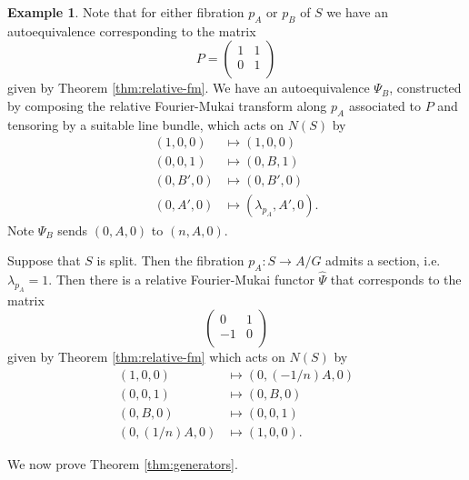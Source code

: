 \documentclass[a4paper, 12pt, twoside]{amsart}
\theoremstyle{plain}
\theoremstyle{definition}
\newtheorem{example}[theorem]{Example}
\begin{document}
\begin{example}\label{ex:relat-four-mukai-examples}
  Note that for either fibration $p_A$ or $p_B$ of $S$ we have an
  autoequivalence corresponding to the matrix
\[ P = 
  \begin{pmatrix}
    1 & 1\\
     0 & 1\\
  \end{pmatrix}
\]
given by Theorem \ref{thm:relative-fm}. We have an autoequivalence
$\Psi_B$, constructed by composing the relative Fourier-Mukai
transform along $p_A$ associated to $P$ and tensoring by a suitable
line bundle, which acts on $N(S)$ by
\begin{align*}
  (1,0,0) &\mapsto (1,0,0)\\
  (0,0,1) &\mapsto (0,B,1)\\
  (0,B',0) &\mapsto (0,B',0)\\
  (0,A',0) &\mapsto (\lambda_{p_A},A',0).
\end{align*}
Note $\Psi_B$ sends $(0,A,0)$ to $(n,A,0)$.
\newline

Suppose that $S$ is split. Then the fibration $p_A \colon S \to A/G$
admits a section, i.e. $\lambda_{p_A} = 1$. Then there is a relative
Fourier-Mukai functor $\hat{\Psi}$ that corresponds to the matrix
\[
  \begin{pmatrix}
  0 & 1 \\
  -1 & 0 \\
  \end{pmatrix}
\]
given by Theorem \ref{thm:relative-fm} which acts on $N(S)$ by
\begin{align*}
  (1,0,0) &\mapsto (0,(-1/n)A,0)\\
  (0,0,1) &\mapsto (0,B,0)\\
  (0,B,0) &\mapsto (0,0,1)\\
  (0,(1/n)A,0) &\mapsto (1,0,0).
\end{align*}
\end{example}

We now prove Theorem \ref{thm:generators}.
\end{document}
